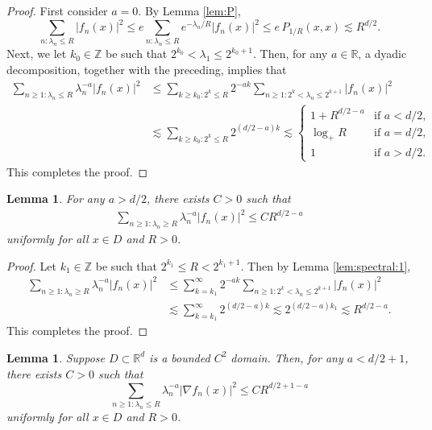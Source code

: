 \documentclass[reqno]{amsart}
\newcommand{\R}{\mathbb R}
\newcommand{\1}{\mathbf 1}
\numberwithin{equation}{section}
\newtheorem{lemma}[theorem]{Lemma}
\theoremstyle{definition}
\begin{document}
\begin{proof}
First consider $a=0$. By Lemma \ref{lem:P},
\[
	\sum_{n: \lambda_n \le R} |f_n(x)|^2 \le e \sum_{n: \lambda_n \le R} e^{-\lambda_n/R}|f_n(x)|^2
	\le e \, P_{1/R}(x,x) \lesssim R^{d/2}.
\]
Next, we let $k_0 \in \mathbb{Z}$ be such that $2^{k_0}< \lambda_1\le 2^{k_0+1}$.
Then, for any $a \in \R$, a dyadic decomposition, together with the preceding, implies that
\begin{align*}
	\sum_{n \ge 1: \lambda_n \le R} \lambda_n^{-a} |f_n(x)|^2 
	&\le \sum_{k\ge k_0: 2^k \le R} 2^{-a k}\sum_{n\ge 1: 2^{k}< \lambda_n \le 2^{k+1}} |f_n(x)|^2\\
	&\lesssim \sum_{k \ge k_0: 2^k \le R} 2^{(d/2-a)k}
	\lesssim 
	\begin{cases}
	1+R^{d/2-a} & \text{if $a<d/2$,}\\
	\log_+ R & \text{if $a=d/2$,}\\
	1 & \text{if $a>d/2$.}
	\end{cases}
\end{align*}
This completes the proof.
\end{proof}

\begin{lemma}\label{lem:spectral:2}
For any $a > d/2$, there exists $C>0$ such that
\begin{align*}
	\sum_{n \ge 1: \lambda_n \ge R} \lambda_n^{-a} |f_n(x)|^2 \le C R^{d/2-a}
\end{align*}
uniformly for all $x \in D$ and $R>0$.
\end{lemma}

\begin{proof}
Let $k_1 \in \mathbb{Z}$ be such that $2^{k_1} \le R < 2^{k_1+1}$. Then by Lemma \ref{lem:spectral:1},
\begin{align*}
	\sum_{n \ge 1: \lambda_n \ge R} \lambda_n^{-a} |f_n(x)|^2 
	&\le \sum_{k= k_1}^\infty 2^{-a k}\sum_{n\ge 1: 2^{k}< \lambda_n \le 2^{k+1}} |f_n(x)|^2\\
	&\lesssim \sum_{k=k_1}^\infty 2^{(d/2-a)k}
	\lesssim 2^{(d/2-a)k_1}
	\lesssim R^{d/2-a}.
\end{align*}
This completes the proof.
\end{proof}

\begin{lemma}\label{lem:spectral:3}
Suppose \(D\subset\R^d\) is a bounded \(C^2\) domain.
Then, for any $a<d/2+1$, there exists $C>0$ such that
\[
    \sum_{n \ge 1: \lambda_n\le R}\lambda_n^{-a}|\nabla f_n(x)|^2
    \le CR^{d/2+1-a}
\]
uniformly for all $x \in D$ and $R > 0$.
\end{lemma}
\end{document}
